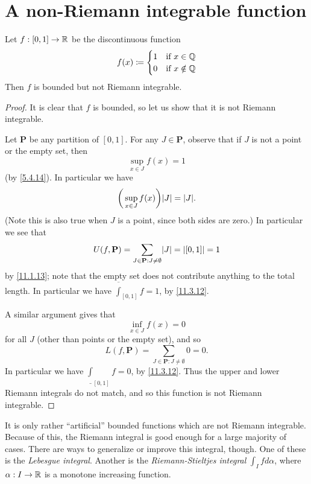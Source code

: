 \section{A non-Riemann integrable function}\label{sec:11.7}

\begin{prop}\label{11.7.1}
  Let \(f : [0, 1] \to \mathbb{R}\) be the discontinuous function
  \[
    f(x) \coloneqq \begin{cases}
      1 & \text{if } x \in \mathbb{Q}    \\
      0 & \text{if } x \notin \mathbb{Q}
    \end{cases}
  \]
  Then \(f\) is bounded but not Riemann integrable.
\end{prop}

\begin{proof}
  It is clear that \(f\) is bounded, so let us show that it is not Riemann integrable.

  Let \(\mathbf{P}\) be any partition of \([0, 1]\).
  For any \(J \in \mathbf{P}\), observe that if \(J\) is not a point or the empty set, then
  \[
    \sup_{x \in J} f(x) = 1
  \]
  (by \cref{5.4.14}).
  In particular we have
  \[
    \bigg(\sup_{x \in J} f(x)\bigg) \abs{J} = \abs{J}.
  \]
  (Note this is also true when \(J\) is a point, since both sides are zero.)
  In particular we see that
  \[
    U(f, \mathbf{P}) = \sum_{J \in \mathbf{P} : J \neq \emptyset} \abs{J} = \abs{[0, 1]} = 1
  \]
  by \cref{11.1.13};
  note that the empty set does not contribute anything to the total length.
  In particular we have \(\overline{\int}_{[0, 1]} f = 1\), by \cref{11.3.12}.

  A similar argument gives that
  \[
    \inf_{x \in J} f(x) = 0
  \]
  for all \(J\) (other than points or the empty set), and so
  \[
    L(f, \mathbf{P}) = \sum_{J \in \mathbf{P} : J \neq \emptyset} 0 = 0.
  \]
  In particular we have \(\underline{\int}_{[0, 1]} f = 0\), by \cref{11.3.12}.
  Thus the upper and lower Riemann integrals do not match, and so this function is not Riemann integrable.
\end{proof}

\begin{rmk}\label{11.7.2}
  It is only rather ``artificial'' bounded functions which are not Riemann integrable.
  Because of this, the Riemann integral is good enough for a large majority of cases.
  There are ways to generalize or improve this integral, though.
  One of these is the \emph{Lebesgue integral}.
  Another is the \emph{Riemann-Stieltjes integral} \(\int_I f d\alpha\), where \(\alpha : I \to \mathbb{R}\) is a monotone increasing function.
\end{rmk}